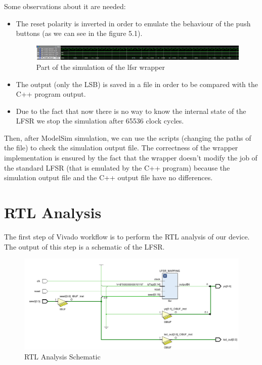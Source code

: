 \documentclass[a4paper]{report}
\begin{document}
\noindent Some observations about it are needed:
\begin{itemize}
	\item The reset polarity is inverted in order to emulate the behaviour of the push buttons (as we can see in the figure 5.1).
	\begin{figure}[htpb]
	\centering
	\includegraphics[width=.64\textheight, height=.09\textheight]{img/tb/wave_lfsr_wrapper_test.png}
	\caption{Part of the simulation of the lfsr wrapper}
	\end{figure}
	\item The output (only the LSB) is saved in a file in order to be compared with the C++ program output.
	\item Due to the fact that now there is no way to know the internal state of the LFSR we stop the simulation after 65536 clock cycles.
\end{itemize}
Then, after ModelSim simulation, we can use the scripts (changing the paths of the file) to check the simulation output file. The correctness of the wrapper implementation is ensured by the fact that the wrapper doesn't modify the job of the standard LFSR (that is emulated by the C++ program) because the simulation output file and the C++ output file have no differences.

\section{RTL Analysis}
The first step of Vivado workflow is to perform the RTL analysis of our device. The output of this step is a schematic of the LFSR.
\begin{figure}[htpb]
	\centering
	\includegraphics[scale=0.5]{img/vivado/rtl_analysis_schematic.PNG}
	\caption{RTL Analysis Schematic}
\end{figure}
\end{document}
